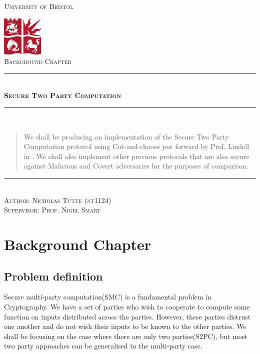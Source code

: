 \documentclass[a4paper,10pt]{article}
\newcommand{\HRule}{\rule{\linewidth}{0.5mm}}
\begin{document}
	\begin{titlepage}
		\begin{center}

			\textsc{\LARGE University of Bristol}
			\vspace{2cm}
    
			\includegraphics[width=0.15\textwidth]{./bristolunilogo}~\\[1cm]
    
			\textsc{\Large Background Chapter}
    
			\vspace{3cm}
			\HRule \\[0.4cm]
			\textsc{ \huge \bfseries Secure Two Party Computation}
			\HRule \\[0.4cm]
			\vspace{2cm}
    
			\begin{abstract}
				We shall be producing an implementation of the Secure Two Party Computation protocol using Cut-and-choose put forward by Prof. Lindell in \cite{Lindell_CnC_2014}. We shall also implement other previous protocols that are also secure against Malicious and Covert adversaries for the purposes of comparison.
			\end{abstract}
    
			\vspace{3cm}
			\noindent\rule{12cm}{0.2pt}\\[0.2cm]
			\textsc{\Large Author: Nicholas Tutte (nt1124)}\\[0.2cm]
			\textsc{\Large Supervisor: Prof. Nigel Smart}
    
		\end{center}
	\end{titlepage}

	\section{Background Chapter}
		\subsection{Problem definition} \label{InformalProbDef}
			Secure multi-party computation(SMC) is a fundamental problem in Cryptography. We have a set of parties who wish to cooperate to compute some function on inputs distributed across the parties. However, these parties distrust one another and do not wish their inputs to be known to the other parties. We shall be focusing on the case where there are only two parties(S2PC), but most two party approaches can be generalised to the multi-party case.\\
\end{document}
